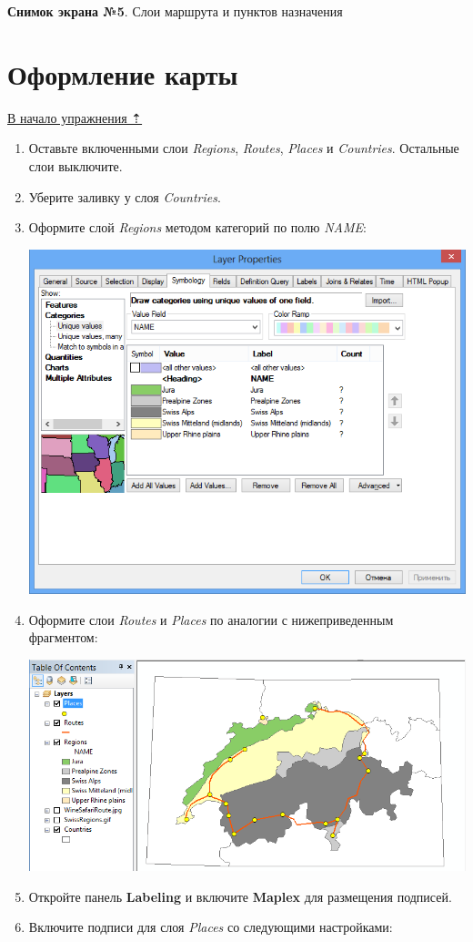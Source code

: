 \documentclass[]{book}
\theoremstyle{definition}
\theoremstyle{definition}
\theoremstyle{definition}
\theoremstyle{remark}
\begin{document}
\textbf{Снимок экрана №5}. Слои маршрута и пунктов назначения

\hypertarget{map-ref-general-design}{%
\section{Оформление карты}\label{map-ref-general-design}}

\protect\hyperlink{map-ref-general}{В начало упражнения ⇡}

\begin{enumerate}
\def\labelenumi{\arabic{enumi}.}
\item
  Оставьте включенными слои \emph{Regions}, \emph{Routes}, \emph{Places}
  и \emph{Countries}. Остальные слои выключите.
\item
  Уберите заливку у слоя \emph{Countries}.
\item
  Оформите слой \emph{Regions} методом категорий по полю \emph{NAME}:

  \includegraphics{images/Ex05/image30.png}
\item
  Оформите слои \emph{Routes} и \emph{Places} по аналогии с
  нижеприведенным фрагментом:

  \includegraphics{images/Ex05/image31.png}
\item
  Откройте панель \textbf{Labeling} и включите \textbf{Maplex} для
  размещения подписей.
\item
  Включите подписи для слоя \emph{Places} со следующими настройками:


\end{enumerate}
\end{document}
